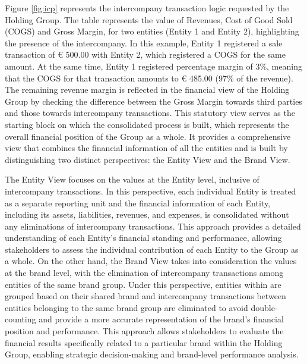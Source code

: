 \documentclass[12pt,a4paper,openright,twoside]{book}
\begin{document}
Figure \ref{fig:icp} represents the intercompany transaction logic requested by the Holding Group.
%
The table represents the value of Revenues, Cost of Good Sold (COGS) and Gross Margin, for two entities (Entity 1 and Entity 2), highlighting the presence of the intercompany.
%
In this example, Entity 1 registered a sale transaction of € 500.00 with Entity 2, which registered a COGS for the same amount. 
%
At the same time, Entity 1 registered percentage margin of 3\%, meaning that the COGS for that transaction amounts to € 485.00 (97\% of the revenue).
%
The remaining revenue margin is reflected in the financial view of the Holding Group by checking the difference between the Gross Margin towards third parties and those towards intercompany transactions.
%
This statutory view serves as the starting block on which the consolidated process is built, which represents the overall financial position of the Group as a whole.
%
It provides a comprehensive view that combines the financial information of all the entities and is built by distinguishing two distinct perspectives: the Entity View and the Brand View.

The Entity View focuses on the values at the Entity level, inclusive of intercompany transactions.
%
In this perspective, each individual Entity is treated as a separate reporting unit and the financial information of each Entity, including its assets, liabilities, revenues, and expenses, is consolidated without any eliminations of intercompany transactions. 
%
This approach provides a detailed understanding of each Entity's financial standing and performance, allowing stakeholders to assess the individual contribution of each Entity to the Group as a whole.
%
On the other hand, the Brand View takes into consideration the values at the brand level, with the elimination of intercompany transactions among entities of the same brand group. 
%
Under this perspective, entities within are grouped based on their shared brand and intercompany transactions between entities belonging to the same brand group are eliminated to avoid double-counting and provide a more accurate representation of the brand's financial position and performance. 
%
This approach allows stakeholders to evaluate the financial results specifically related to a particular brand within the Holding Group, enabling strategic decision-making and brand-level performance analysis.
\end{document}
